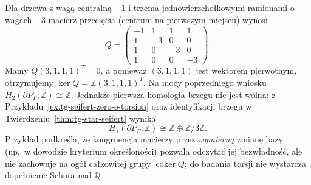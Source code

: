 \begin{przyklad}
\label{ex:tg-star-zero-e-kernel}
Dla drzewa z wagą centralną $-1$ i trzema
jednowierzchołkowymi ramionami o wagach $-3$
macierz przecięcia (centrum na pierwszym miejscu)
wynosi
\[
Q=\begin{pmatrix}
-1&1&1&1\\
1&-3&0&0\\
1&0&-3&0\\
1&0&0&-3
\end{pmatrix}.
\]
Mamy $Q(3,1,1,1)^T=0$, a ponieważ
$(3,1,1,1)$ jest wektorem pierwotnym,
otrzymujemy $\ker Q=\mathbb Z(3,1,1,1)^T$.
Na mocy poprzedniego wniosku
$H_2(\partial P_\Gamma;\mathbb Z)\cong\mathbb Z$.
Jednakże pierwsza homologia brzegu
nie jest wolna: z
Przykładu~\ref{ex:tg-seifert-zero-e-torsion}
oraz identyfikacji brzegu
w Twierdzeniu~\ref{thm:tg-star-seifert}
wynika
\[
H_1(\partial P_\Gamma;\mathbb Z)
\cong\mathbb Z\oplus\mathbb Z/3\mathbb Z.
\]
Przykład podkreśla, że kongruencja
macierzy przez \emph{wymierną} zmianę bazy
(np.\ w dowodzie kryterium określoności)
pozwala odczytać jej bezwładność,
ale nie zachowuje na ogół całkowitej grupy
$\operatorname{coker}Q$; do badania torsji
nie wystarcza dopełnienie Schura nad $\mathbb Q$.
\end{przyklad}

